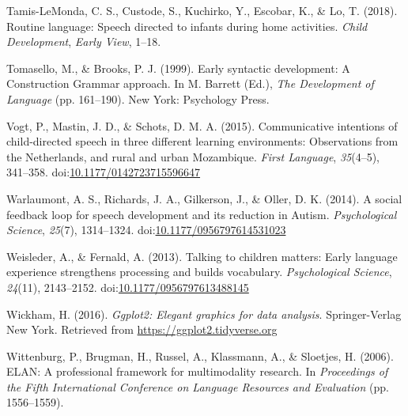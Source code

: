 \documentclass[,man,floatsintext]{apa6}
\begin{document}
\hypertarget{ref-tamislemonda2018routine}{}
Tamis-LeMonda, C. S., Custode, S., Kuchirko, Y., Escobar, K., \& Lo, T.
(2018). Routine language: Speech directed to infants during home
activities. \emph{Child Development}, \emph{Early View}, 1--18.

\hypertarget{ref-tomasello1999early}{}
Tomasello, M., \& Brooks, P. J. (1999). Early syntactic development: A
Construction Grammar approach. In M. Barrett (Ed.), \emph{The
Development of Language} (pp. 161--190). New York: Psychology Press.

\hypertarget{ref-vogt2015communicative}{}
Vogt, P., Mastin, J. D., \& Schots, D. M. A. (2015). Communicative
intentions of child-directed speech in three different learning
environments: Observations from the Netherlands, and rural and urban
Mozambique. \emph{First Language}, \emph{35}(4--5), 341--358.
doi:\href{https://doi.org/10.1177/0142723715596647}{10.1177/0142723715596647}

\hypertarget{ref-warlaumont2014social}{}
Warlaumont, A. S., Richards, J. A., Gilkerson, J., \& Oller, D. K.
(2014). A social feedback loop for speech development and its reduction
in Autism. \emph{Psychological Science}, \emph{25}(7), 1314--1324.
doi:\href{https://doi.org/10.1177/0956797614531023}{10.1177/0956797614531023}

\hypertarget{ref-weisleder2013talking}{}
Weisleder, A., \& Fernald, A. (2013). Talking to children matters: Early
language experience strengthens processing and builds vocabulary.
\emph{Psychological Science}, \emph{24}(11), 2143--2152.
doi:\href{https://doi.org/10.1177/0956797613488145}{10.1177/0956797613488145}

\hypertarget{ref-R-ggplot2}{}
Wickham, H. (2016). \emph{Ggplot2: Elegant graphics for data analysis}.
Springer-Verlag New York. Retrieved from
\url{https://ggplot2.tidyverse.org}

\hypertarget{ref-ELAN}{}
Wittenburg, P., Brugman, H., Russel, A., Klassmann, A., \& Sloetjes, H.
(2006). ELAN: A professional framework for multimodality research. In
\emph{Proceedings of the Fifth International Conference on Language
Resources and Evaluation} (pp. 1556--1559).

\endgroup
\end{document}
